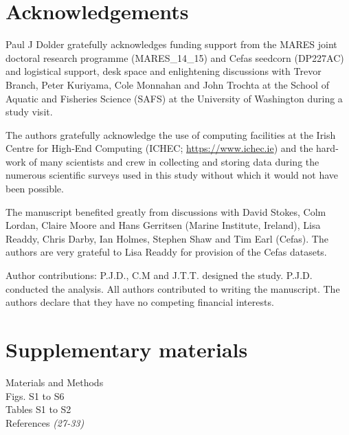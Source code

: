 \documentclass[12pt]{article}
\begin{document}




\newpage


\section*{Acknowledgements}

Paul J Dolder gratefully acknowledges funding support from the MARES joint
doctoral research programme (MARES\_14\_15) and Cefas seedcorn (DP227AC) and
logistical support, desk space and enlightening discussions with Trevor Branch,
Peter Kuriyama, Cole Monnahan and John Trochta at the School of Aquatic and
Fisheries Science (SAFS) at the University of Washington during a study visit.

The authors gratefully acknowledge the use of computing facilities at the Irish
Centre for High-End Computing (ICHEC; \url{https://www.ichec.ie}) and the
hard-work of many scientists and crew in collecting and storing data during the
numerous scientific surveys used in this study without which it would not have
been possible.  
	 
The manuscript benefited greatly from discussions with David Stokes, Colm
Lordan, Claire Moore and Hans Gerritsen (Marine Institute, Ireland), Lisa
Readdy, Chris Darby, Ian Holmes, Stephen Shaw and Tim Earl (Cefas).  The
authors are very grateful to Lisa Readdy for provision of the Cefas datasets.

Author contributions: P.J.D., C.M and J.T.T. designed the study. P.J.D.
conducted the analysis. All authors contributed to writing the manuscript. The
authors declare that they have no competing financial interests.


\section*{Supplementary materials}
Materials and Methods\\
Figs. S1 to S6\\
Tables S1 to S2\\
References \textit{(27-33)}
\end{document}
